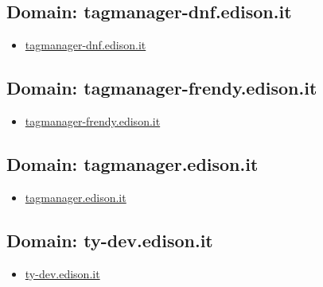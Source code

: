 \documentclass{article}
\begin{document}
    \subsection{Domain: tagmanager-dnf.edison.it}
    \begin{itemize}
        
            
                
                \item \href{ http://tagmanager-dnf.edison.it/}{ tagmanager-dnf.edison.it }
            
        
    \end{itemize}

    \subsection{Domain: tagmanager-frendy.edison.it}
    \begin{itemize}
        
            
                
                \item \href{ http://tagmanager-frendy.edison.it/}{ tagmanager-frendy.edison.it }
            
        
    \end{itemize}

    \subsection{Domain: tagmanager.edison.it}
    \begin{itemize}
        
            
                
                \item \href{ http://tagmanager.edison.it/}{ tagmanager.edison.it }
            
        
    \end{itemize}

    \subsection{Domain: ty-dev.edison.it}
    \begin{itemize}
        
            
                
                \item \href{ https://ty-dev.edison.it/}{ ty-dev.edison.it }
            
        
    \end{itemize}
\end{document}
